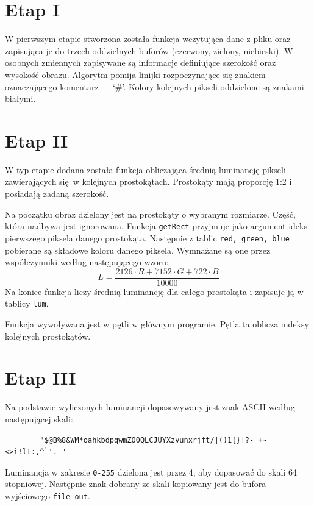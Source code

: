 \documentclass[polish, 11pt]{article}
\begin{document}
\section{Etap I}
    W pierwszym etapie stworzona została funkcja wczytująca dane z pliku oraz zapisująca je do trzech oddzielnych buforów (czerwony, zielony, niebieski).
    W osobnych zmiennych zapisywane są informacje definiujące szerokość oraz wysokość obrazu.
    Algorytm pomija linijki rozpoczynające się znakiem oznaczającego komentarz --- `\#'.
    Kolory kolejnych pikseli oddzielone są znakami białymi.
    
    

\section{Etap II}
    W typ etapie dodana została funkcja obliczająca średnią luminancję pikseli zawierających się w kolejnych prostokątach.
    Prostokąty mają proporcję 1:2 i posiadają zadaną szerokość.
    
    Na początku obraz dzielony jest na prostokąty o wybranym rozmiarze.
    Część, która nadbywa jest ignorowana.
    Funkcja \verb|getRect| przyjmuje jako argument ideks pierwszego piksela danego prostokąta.
    Następnie z tablic \verb|red, green, blue| pobierane są składowe koloru danego piksela.
    Wymnażane są one przez współczynniki według następującego wzoru:
    \begin{displaymath}
        L = \frac{2126\cdot R+7152\cdot G+722\cdot B}{10000}
    \end{displaymath}
    Na koniec funkcja liczy średnią luminancję dla całego prostokąta i zapisuje ją w tablicy \verb|lum|.

    Funkcja wywoływana jest w pętli w głównym programie.
    Pętla ta oblicza indeksy kolejnych prostokątów.

    
    

\section{Etap III}
    Na podstawie wyliczonych luminancji dopasowywany jest znak ASCII według następującej skali:\\
    \begin{verbatim}
        "$@B%8&WM*oahkbdpqwmZO0QLCJUYXzvunxrjft/|()1{}]?-_+~<>i!lI:,^`'. "
    \end{verbatim}
    Luminancja w zakresie \verb|0-255| dzielona jest przez 4, aby dopasować do skali 64 stopniowej.
    Następnie znak dobrany ze skali kopiowany jest do bufora wyjściowego \verb|file_out|.
\end{document}
